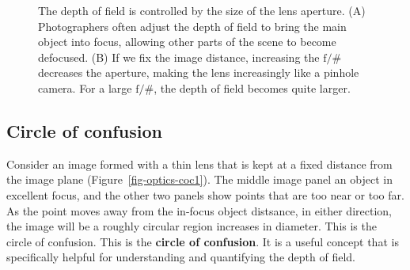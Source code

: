 \documentclass[
  letterpaper,
]{book}
\begin{document}
\begin{figure}


\caption{\label{fig-optics-bokeh}The depth of field is controlled by the
size of the lens aperture. (A) Photographers often adjust the depth of
field to bring the main object into focus, allowing other parts of the
scene to become defocused. (B) If we fix the image distance, increasing
the \(\mathrm{f}/\#\) decreases the aperture, making the lens
increasingly like a pinhole camera. For a large \(\mathrm{f}/\#\), the
depth of field becomes quite larger.}

\end{figure}%

\subsection{Circle of confusion}\label{sec-optics-coc}

Consider an image formed with a thin lens that is kept at a fixed
distance from the image plane (Figure~\ref{fig-optics-coc1}). The middle
image panel an object in excellent focus, and the other two panels show
points that are too near or too far. As the point moves away from the
in-focus object distsance, in either direction, the image will be a
roughly circular region increases in diameter. This is the circle of
confusion. This is the \textbf{circle of confusion}. It is a useful
concept that is specifically helpful for understanding and quantifying
the depth of field.
\end{document}
